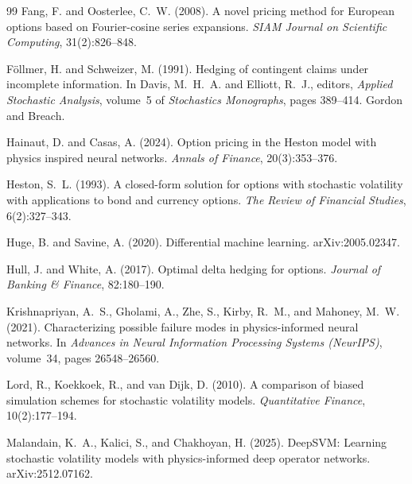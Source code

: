 \documentclass{article}
\begin{document}
\begin{thebibliography}{99}
Fang, F. and Oosterlee, C.~W. (2008).
\newblock A novel pricing method for European options based on Fourier-cosine
series expansions.
\newblock \emph{SIAM Journal on Scientific Computing}, 31(2):826--848.
 
F\"ollmer, H. and Schweizer, M. (1991).
\newblock Hedging of contingent claims under incomplete information.
\newblock In Davis, M.~H.~A. and Elliott, R.~J., editors, \emph{Applied Stochastic
Analysis}, volume~5 of \emph{Stochastics Monographs}, pages 389--414. Gordon and
Breach.
 
Hainaut, D. and Casas, A. (2024).
\newblock Option pricing in the Heston model with physics inspired neural networks.
\newblock \emph{Annals of Finance}, 20(3):353--376.
 
Heston, S.~L. (1993).
\newblock A closed-form solution for options with stochastic volatility with
applications to bond and currency options.
\newblock \emph{The Review of Financial Studies}, 6(2):327--343.
 
Huge, B. and Savine, A. (2020).
\newblock Differential machine learning.
\newblock arXiv:2005.02347.
 
Hull, J. and White, A. (2017).
\newblock Optimal delta hedging for options.
\newblock \emph{Journal of Banking \& Finance}, 82:180--190.
 
Krishnapriyan, A.~S., Gholami, A., Zhe, S., Kirby, R.~M., and Mahoney, M.~W. (2021).
\newblock Characterizing possible failure modes in physics-informed neural networks.
\newblock In \emph{Advances in Neural Information Processing Systems (NeurIPS)},
volume~34, pages 26548--26560.

 

Lord, R., Koekkoek, R., and van Dijk, D. (2010).
\newblock A comparison of biased simulation schemes for stochastic volatility
models.
\newblock \emph{Quantitative Finance}, 10(2):177--194.

Malandain, K.~A., Kalici, S., and Chakhoyan, H. (2025).
\newblock DeepSVM: Learning stochastic volatility models with physics-informed
deep operator networks.
\newblock arXiv:2512.07162.
 

\end{thebibliography}
\end{document}
